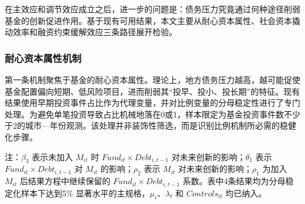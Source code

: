 在主效应和调节效应成立之后，进一步的问题是：债务压力究竟通过何种途径削弱基金的创新促进作用。基于现有可用结果，本文主要从耐心资本属性、社会资本撬动效率和融资约束缓解效应三条路径展开检验。

\subsubsection{耐心资本属性机制}

第一条机制聚焦于基金的耐心资本属性。理论上，地方债务压力越高，越可能促使基金配置偏向短期、低风险项目，进而削弱其“投早、投小、投长期”的特征。现有结果使用早期投资事件占比作为代理变量，并对比例变量的分母稳定性进行了专门处理。为避免单笔投资导致占比机械地落在0或1，样本限定为基金投资事件数不少于2的城市—年份观测。该处理并非装饰性筛选，而是识别比例机制所必需的稳健化步骤。

\begin{table}[htbp]
  \centering
  \caption{耐心资本属性机制：5\% 水平主结果}
  {\fangsong{}

  \par\smallskip
  {\songti{}注：$\beta_3$ 表示未加入 $M_{it}$ 时 $Fund_{it}\times Debt_{i,t-1}$ 对未来创新的影响；$\theta_1$ 表示 $Fund_{it}\times Debt_{i,t-1}$ 对 $M_{it}$ 的影响；$\rho_2$ 表示 $M_{it}$ 对未来创新的影响；$\rho_1$ 为加入 $M_{it}$ 后结果方程中继续保留的 $Fund_{it}\times Debt_{i,t-1}$ 系数。表中4条结果均为分母稳定化样本下达到5\% 显著水平的主规格，$\mu_i$、$\lambda_t$ 和 $Controls_{it}$ 均已纳入。}
  }
\end{table}

